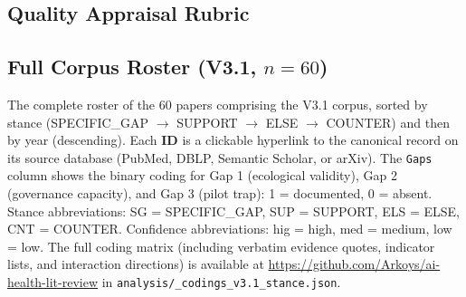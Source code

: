 \subsection{Quality Appraisal Rubric}
\label{sec:quality_rubric}




\subsection{Full Corpus Roster (V3.1, $n=60$)}
\label{sec:corpus_roster}

The complete roster of the 60 papers comprising the V3.1 corpus,
sorted by stance (SPECIFIC\_GAP $\rightarrow$ SUPPORT $\rightarrow$
ELSE $\rightarrow$ COUNTER) and then by year (descending). Each
\textbf{ID} is a clickable hyperlink to the canonical record on
its source database (PubMed, DBLP, Semantic Scholar, or arXiv).
The \texttt{Gaps} column shows the binary coding for Gap 1
(ecological validity), Gap 2 (governance capacity), and Gap 3
(pilot trap): 1 = documented, 0 = absent. Stance abbreviations:
SG = SPECIFIC\_GAP, SUP = SUPPORT, ELS = ELSE, CNT = COUNTER.
Confidence abbreviations: hig = high, med = medium, low = low.
The full coding matrix (including verbatim evidence quotes,
indicator lists, and interaction directions) is available at
\url{https://github.com/Arkoys/ai-health-lit-review} in
\texttt{analysis/\_codings\_v3.1\_stance.json}.

